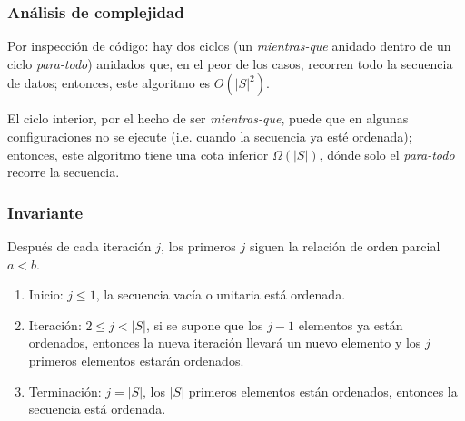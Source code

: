 \documentclass[]{article}
\begin{document}
\subsubsection{Análisis de complejidad} \label{algoritmos:insercion:complejidad}

Por inspección de código: hay dos ciclos (un {\it mientras-que} anidado dentro de un ciclo {\it para-todo}) anidados que, en el peor de los casos, recorren todo la secuencia de datos; entonces, este algoritmo es $O(|S|^2)$.

El ciclo interior, por el hecho de ser {\it mientras-que}, puede que en algunas configuraciones no se ejecute (i.e. cuando la secuencia ya esté ordenada); entonces, este algoritmo tiene una cota inferior $\Omega(|S|)$, dónde solo el {\it para-todo} recorre la secuencia.

\subsubsection{Invariante} \label{algoritmos:insercion:invariante}

Después de cada iteración $j$, los primeros $j$ siguen la relación de orden parcial $a<b$.

\begin{enumerate}
    \item Inicio: $j \le 1$, la secuencia vacía o unitaria está ordenada.
    \item Iteración: $2 \le j < |S|$, si se supone que los $j-1$ elementos ya están ordenados, entonces la nueva iteración llevará un nuevo elemento y los $j$ primeros elementos estarán ordenados.
    \item Terminación: $j=|S|$, los $|S|$ primeros elementos están ordenados, entonces la secuencia está ordenada.
\end{enumerate}
\newpage
\end{document}
